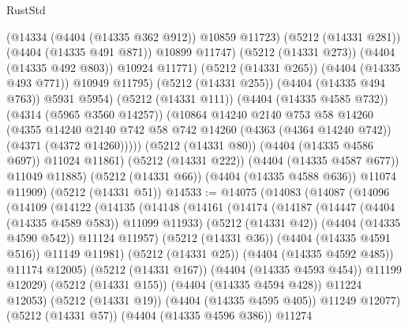 \begin{lexlean}{RustStd}
\begin{coremodule}
                    (@14334 (@4404 (@14335 @362 @912)) @10859 @11723)
                    (@5212 (@14331 @281))
                    (@4404 (@14335 @491 @871))
                    @10899
                    @11747)
                  (@5212 (@14331 @273))
                  (@4404 (@14335 @492 @803))
                  @10924
                  @11771)
                (@5212 (@14331 @265))
                (@4404 (@14335 @493 @771))
                @10949
                @11795)
              (@5212 (@14331 @255))
              (@4404 (@14335 @494 @763))
              @5931
              @5954)
            (@5212 (@14331 @111))
            (@4404 (@14335 @4585 @732))
            (@4314 (@5965 @3560 @14257))
            (@10864
              @14240
              @2140
              @753
              @58
              @14260
              (@4355
                @14240
                @2140
                @742
                @58
                @742
                @14260
                (@4363 (@4364 @14240 @742))
                (@4371 (@4372 @14260)))))
          (@5212 (@14331 @80))
          (@4404 (@14335 @4586 @697))
          @11024
          @11861)
        (@5212 (@14331 @222))
        (@4404 (@14335 @4587 @677))
        @11049
        @11885)
      (@5212 (@14331 @66))
      (@4404 (@14335 @4588 @636))
      @11074
      @11909)
    (@5212 (@14331 @51))
@14533 := @14075
    (@14083
      (@14087
        (@14096
          (@14109
            (@14122
              (@14135
                (@14148
                  (@14161
                    (@14174
                      (@14187
                        (@14447 (@4404 (@14335 @4589 @583)) @11099 @11933)
                        (@5212 (@14331 @42))
                        (@4404 (@14335 @4590 @542))
                        @11124
                        @11957)
                      (@5212 (@14331 @36))
                      (@4404 (@14335 @4591 @516))
                      @11149
                      @11981)
                    (@5212 (@14331 @25))
                    (@4404 (@14335 @4592 @485))
                    @11174
                    @12005)
                  (@5212 (@14331 @167))
                  (@4404 (@14335 @4593 @454))
                  @11199
                  @12029)
                (@5212 (@14331 @155))
                (@4404 (@14335 @4594 @428))
                @11224
                @12053)
              (@5212 (@14331 @19))
              (@4404 (@14335 @4595 @405))
              @11249
              @12077)
            (@5212 (@14331 @57))
            (@4404 (@14335 @4596 @386))
            @11274

\end{coremodule}
\end{lexlean}

